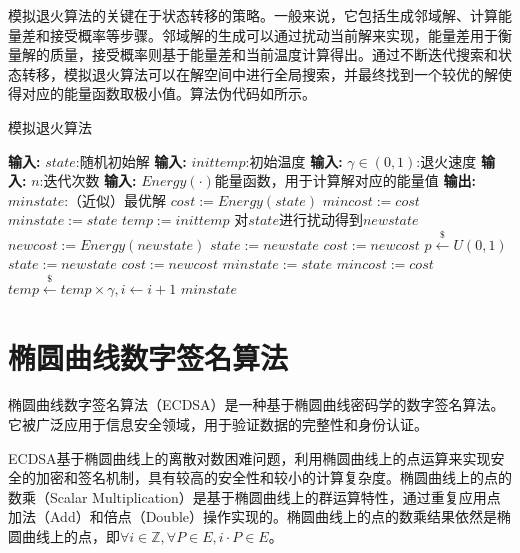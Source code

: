 {	模拟退火算法的关键在于状态转移的策略。一般来说，它包括生成邻域解、计算能量差和接受概率等步骤。邻域解的生成可以通过扰动当前解来实现，能量差用于衡量解的质量，接受概率则基于能量差和当前温度计算得出。通过不断迭代搜索和状态转移，模拟退火算法可以在解空间中进行全局搜索，并最终找到一个较优的解使得对应的能量函数取极小值。算法伪代码如所示。
	
	\begin{breakablealgorithm}%
		\caption{模拟退火算法}\label{alg:sa}
		\begin{algorithmic}[1]
			\Statex \textbf{输入:} $state$:随机初始解
			\Statex \textbf{输入:} $inittemp$:初始温度
			\Statex \textbf{输入:} $\gamma\in(0,1)$:退火速度
			\Statex \textbf{输入:} $n$:迭代次数
			\Statex \textbf{输入:} $Energy(\cdot)$能量函数，用于计算解对应的能量值
			\Statex \textbf{输出:} $minstate$:（近似）最优解
			\State $cost := Energy(state)$
			\State $mincost:=cost$
			\State $minstate:=state$
			\State $temp:=inittemp$
				\Repeat
					\State 对$state$进行扰动得到$newstate$
					\State $newcost:=Energy(newstate)$
						\State $state:= newstate$
						\State $cost:= newcost$
					\Else
						\State $p\stackrel{\$}\gets U(0,1)$
							\State $state:= newstate$
							\State$cost:= newcost$
						\EndIf
					\EndIf
						\State $minstate:= state$
						\State $mincost:= cost$
					\EndIf
				\State $temp\stackrel{\$}\gets temp\times\gamma,i\gets i+1$
			\EndFor
			\State \Return $minstate$
		\end{algorithmic}
	\end{breakablealgorithm}

	\section{椭圆曲线数字签名算法}\label{sec:ecdsa}
	椭圆曲线数字签名算法（ECDSA）是一种基于椭圆曲线密码学的数字签名算法。它被广泛应用于信息安全领域，用于验证数据的完整性和身份认证。
	
	ECDSA基于椭圆曲线上的离散对数困难问题，利用椭圆曲线上的点运算来实现安全的加密和签名机制，具有较高的安全性和较小的计算复杂度。椭圆曲线上的点的数乘（Scalar Multiplication）是基于椭圆曲线上的群运算特性，通过重复应用点加法（Add）和倍点（Double）操作实现的。椭圆曲线上的点的数乘结果依然是椭圆曲线上的点，即$\forall i\in\mathbb Z,\forall P\in E, i\cdot P\in E$。
	
}

